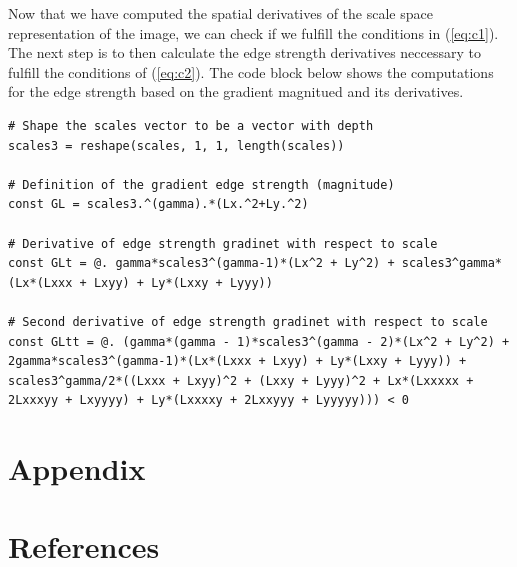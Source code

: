 \documentclass{article}
\begin{document}
Now that we have computed the spatial derivatives of the scale space representation of the image, we can check if we fulfill the conditions in (\ref{eq:c1}). 
The next step is to then calculate the edge strength derivatives neccessary to fulfill the conditions of (\ref{eq:c2}).
The code block below shows the computations for the edge strength based on the gradient magnitued and its derivatives.

\newpage

\begin{lstlisting}
# Shape the scales vector to be a vector with depth
scales3 = reshape(scales, 1, 1, length(scales))

# Definition of the gradient edge strength (magnitude)
const GL = scales3.^(gamma).*(Lx.^2+Ly.^2)

# Derivative of edge strength gradinet with respect to scale
const GLt = @. gamma*scales3^(gamma-1)*(Lx^2 + Ly^2) + scales3^gamma*(Lx*(Lxxx + Lxyy) + Ly*(Lxxy + Lyyy))

# Second derivative of edge strength gradinet with respect to scale
const GLtt = @. (gamma*(gamma - 1)*scales3^(gamma - 2)*(Lx^2 + Ly^2) + 2gamma*scales3^(gamma-1)*(Lx*(Lxxx + Lxyy) + Ly*(Lxxy + Lyyy)) + scales3^gamma/2*((Lxxx + Lxyy)^2 + (Lxxy + Lyyy)^2 + Lx*(Lxxxxx + 2Lxxxyy + Lxyyyy) + Ly*(Lxxxxy + 2Lxxyyy + Lyyyyy))) < 0
\end{lstlisting}

\section*{Appendix}



\section*{References}
\end{document}
